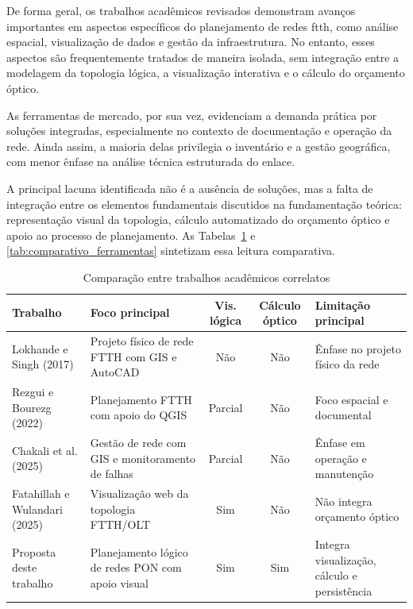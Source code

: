 De forma geral, os trabalhos acadêmicos revisados demonstram avanços importantes em aspectos específicos do planejamento de redes \gls{ftth}, como análise espacial, visualização de dados e gestão da infraestrutura. No entanto, esses aspectos são frequentemente tratados de maneira isolada, sem integração entre a modelagem da topologia lógica, a visualização interativa e o cálculo do orçamento óptico. 

As ferramentas de mercado, por sua vez, evidenciam a demanda prática por soluções integradas, especialmente no contexto de documentação e operação da rede. Ainda assim, a maioria delas privilegia o inventário e a gestão geográfica, com menor ênfase na análise técnica estruturada do enlace. 

A principal lacuna identificada não é a ausência de soluções, mas a falta de integração entre os elementos fundamentais discutidos na fundamentação teórica: representação visual da topologia, cálculo automatizado do orçamento óptico e apoio ao processo de planejamento. As Tabelas~\ref{tab:comparativo_trabalhos} e \ref{tab:comparativo_ferramentas} sintetizam essa leitura comparativa.

\begin{table}[htb]
    \centering
    \caption{Comparação entre trabalhos acadêmicos correlatos}
    \label{tab:comparativo_trabalhos}
    \small
    \begin{tabularx}{\textwidth}{|p{3.0cm}|X|c|c|X|}
        \hline
        \textbf{Trabalho} & \textbf{Foco principal} & \textbf{Vis. lógica} & \textbf{Cálculo óptico} & \textbf{Limitação principal} \\
        \hline
        Lokhande e Singh (2017) & Projeto físico de rede FTTH com GIS e AutoCAD & Não & Não & Ênfase no projeto físico da rede \\
        \hline
        Rezgui e Bourezg (2022) & Planejamento FTTH com apoio do QGIS & Parcial & Não & Foco espacial e documental \\
        \hline
        Chakali et al. (2025) & Gestão de rede com GIS e monitoramento de falhas & Parcial & Não & Ênfase em operação e manutenção \\
        \hline
        Fatahillah e Wulandari (2025) & Visualização web da topologia FTTH/OLT & Sim & Não & Não integra orçamento óptico \\
        \hline
        Proposta deste trabalho & Planejamento lógico de redes PON com apoio visual & Sim & Sim & Integra visualização, cálculo e persistência \\
        \hline
    \end{tabularx}
\end{table}

